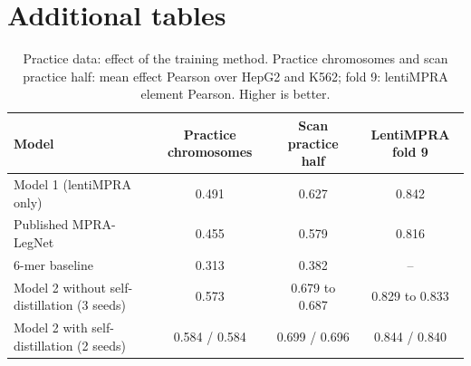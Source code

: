 \documentclass[11pt]{article}
\begin{document}



\clearpage
\appendix
\section{Additional tables}
\label{sec:appendix}

\begin{table}[h]
\centering
\caption{Practice data: effect of the training method. Practice chromosomes and scan practice half: mean effect Pearson over HepG2 and K562; fold 9: lentiMPRA element Pearson. Higher is better.}
\label{tab:ablation}
\footnotesize
\begin{tabular}{lccc}
\toprule
Model & Practice chromosomes & Scan practice half & LentiMPRA fold 9 \\
\midrule
Model 1 (lentiMPRA only) & 0.491 & 0.627 & 0.842 \\
Published MPRA-LegNet & 0.455 & 0.579 & 0.816 \\
6-mer baseline & 0.313 & 0.382 & -- \\
Model 2 without self-distillation (3 seeds) & 0.573 & 0.679 to 0.687 & 0.829 to 0.833 \\
Model 2 with self-distillation (2 seeds) & 0.584 / 0.584 & 0.699 / 0.696 & 0.844 / 0.840 \\
\bottomrule
\end{tabular}
\end{table}
\end{document}
